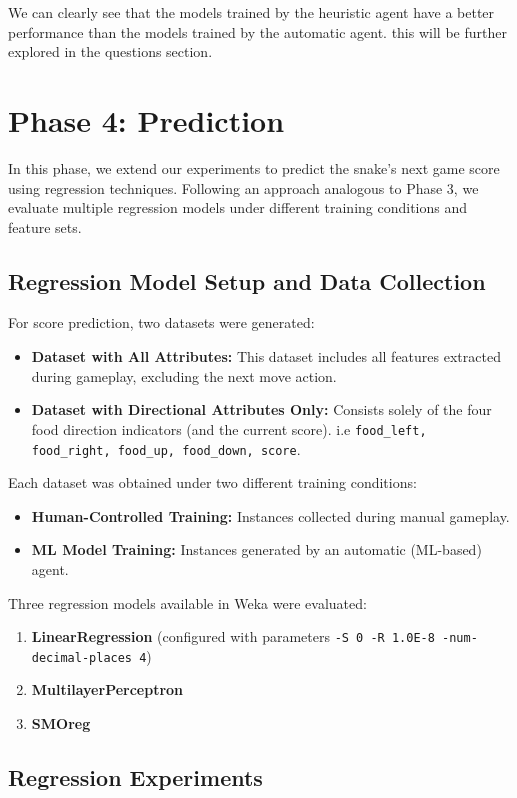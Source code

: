 \documentclass[12pt,a4paper]{article}
\begin{document}
We can clearly see that the models trained by the heuristic agent have a better performance than the models trained by the automatic agent.
this will be further explored in the questions section.



\section{Phase 4: Prediction}
In this phase, we extend our experiments to predict the snake’s next game score using regression techniques. Following an approach analogous to Phase 3, we evaluate multiple regression models under different training conditions and feature sets.

\subsection{Regression Model Setup and Data Collection}
For score prediction, two datasets were generated:
\begin{itemize}
    \item \textbf{Dataset with All Attributes:} This dataset includes all features extracted during gameplay, excluding the next move action.
    \item \textbf{Dataset with Directional Attributes Only:} Consists solely of the four food direction indicators (and the current score). i.e \texttt{food\_left, food\_right, food\_up, food\_down, score}.
\end{itemize}
Each dataset was obtained under two different training conditions:
\begin{itemize}
    \item \textbf{Human-Controlled Training:} Instances collected during manual gameplay.
    \item \textbf{ML Model Training:} Instances generated by an automatic (ML-based) agent.
\end{itemize}
Three regression models available in Weka were evaluated:
\begin{enumerate}
    \item \textbf{LinearRegression} (configured with parameters \texttt{-S 0 -R 1.0E-8 -num-decimal-places 4})
    \item \textbf{MultilayerPerceptron}
    \item \textbf{SMOreg}
\end{enumerate}

\subsection{Regression Experiments}
\end{document}

